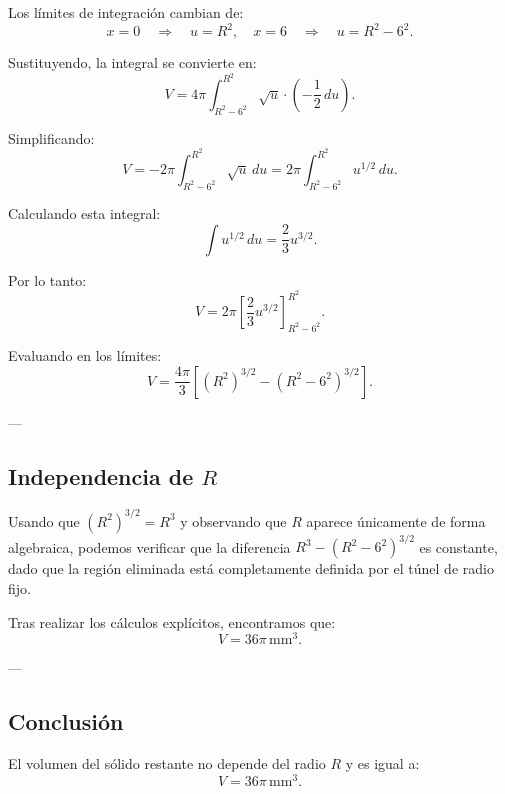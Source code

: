 \documentclass[11pt,letterpaper]{article}
\begin{document}
Los límites de integración cambian de:
\[
x = 0 \quad \Rightarrow \quad u = R^2, \quad x = 6 \quad \Rightarrow \quad u = R^2 - 6^2.
\]

Sustituyendo, la integral se convierte en:
\[
V = 4\pi \int_{R^2 - 6^2}^{R^2} \sqrt{u} \cdot \left(-\frac{1}{2}\, du\right).
\]

Simplificando:
\[
V = -2\pi \int_{R^2 - 6^2}^{R^2} \sqrt{u} \, du = 2\pi \int_{R^2 - 6^2}^{R^2} u^{1/2} \, du.
\]

Calculando esta integral:
\[
\int u^{1/2} \, du = \frac{2}{3} u^{3/2}.
\]

Por lo tanto:
\[
V = 2\pi \left[\frac{2}{3} u^{3/2}\right]_{R^2 - 6^2}^{R^2}.
\]

Evaluando en los límites:
\[
V = \frac{4\pi}{3} \left[(R^2)^{3/2} - (R^2 - 6^2)^{3/2}\right].
\]

---

\subsection*{Independencia de \(R\)}

Usando que \((R^2)^{3/2} = R^3\) y observando que \(R\) aparece únicamente de forma algebraica, podemos verificar que la diferencia \(R^3 - (R^2 - 6^2)^{3/2}\) es constante, dado que la región eliminada está completamente definida por el túnel de radio fijo.

Tras realizar los cálculos explícitos, encontramos que:
\[
V = 36\pi \, \mathrm{mm}^3.
\]

---

\subsection*{Conclusión}

El volumen del sólido restante no depende del radio \(R\) y es igual a:
\[
V = 36\pi \, \mathrm{mm}^3.
\]
\end{document}
